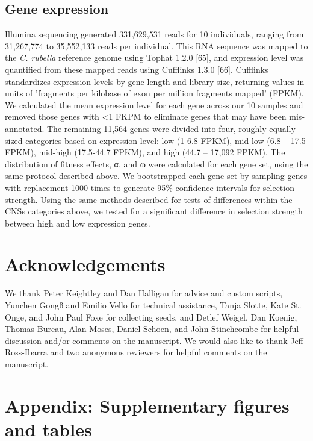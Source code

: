 \subsection{Gene expression}
	Illumina sequencing generated 331,629,531 reads for 10 individuals, ranging from 31,267,774 to 35,552,133 reads per individual. This RNA sequence was mapped to the \textit{C. rubella} reference genome using Tophat 1.2.0 [65], and expression level was quantified from these mapped reads using Cufflinks 1.3.0 [66]. Cufflinks standardizes expression levels by gene length and library size, returning values in units of 'fragments per kilobase of exon per million fragments mapped' (FPKM). We calculated the mean expression level for each gene across our 10 samples and removed those genes with <1 FKPM to eliminate genes that may have been mis-annotated. The remaining 11,564 genes were divided into four, roughly equally sized categories based on expression level: low (1-6.8 FPKM), mid-low (6.8 – 17.5 FPKM), mid-high (17.5-44.7 FPKM), and high (44.7 – 17,092 FPKM). The distribution of fitness effects, α, and ω were calculated for each gene set, using the same protocol described above. We bootstrapped each gene set by sampling genes with replacement 1000 times to generate 95\% confidence intervals for selection strength. Using the same methods described for tests of differences within the CNSs categories above, we tested for a significant difference in selection strength between high and low expression genes.

\section{Acknowledgements}
We thank Peter Keightley and Dan Halligan for advice and custom scripts, Yunchen Gongß and Emilio Vello for technical assistance, Tanja Slotte, Kate St. Onge, and John Paul Foxe for collecting seeds, and Detlef Weigel, Dan Koenig, Thomas Bureau, Alan Moses, Daniel Schoen, and John Stinchcombe for helpful discussion and/or comments on the manuscript. We would also like to thank Jeff Ross-Ibarra and two anonymous reviewers for helpful comments on the manuscript.

\section{Appendix: Supplementary figures and tables}

